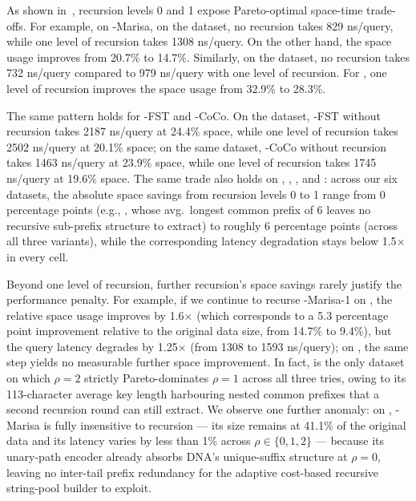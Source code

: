 As shown in~, recursion levels 0 and 1 expose Pareto-optimal space-time trade-offs.
  For example, on \csquared-Marisa, on the \logdata dataset, no recursion takes
  829 ns/query, while one level of recursion takes 1308 ns/query. On the other
  hand, the space usage improves from 20.7\% to 14.7\%. Similarly, on the
  \wikidata dataset, no recursion takes 732 ns/query compared to 979 ns/query
  with one level of recursion. For \wikidata, one level of recursion improves
  the space usage from 32.9\% to 28.3\%.

  The same pattern holds for \csquared-FST and \csquared-CoCo. On the \logdata
  dataset, \csquared-FST without recursion takes 2187 ns/query at 24.4\% space,
  while one level of recursion takes 2502 ns/query at 20.1\% space; on the same
  dataset, \csquared-CoCo without recursion takes 1463 ns/query at 23.9\% space,
  while one level of recursion takes 1745 ns/query at 19.6\% space. The same
  trade also holds on \wikidata, \xmldata, \urldata, and \dnadata: across our
  six datasets, the absolute space savings from recursion levels 0 to 1 range
  from 0 percentage points (e.g., \wordsdata, whose avg.\ longest common prefix
  of 6 leaves no recursive sub-prefix structure to extract) to roughly 6
  percentage points (\logdata across all three variants), while the
  corresponding latency degradation stays below 1.5$\times$ in every cell.

  Beyond one level of recursion, further recursion's space savings rarely justify the
  performance penalty. For example, if we continue to recurse \csquared-Marisa-1
  on \logdata, the relative space usage improves by 1.6$\times$ (which
  corresponds to a 5.3 percentage point improvement relative to the original
  data size, from 14.7\% to 9.4\%), but the query latency degrades by 1.25$\times$
  (from 1308 to 1593 ns/query); on \xmldata, the same step yields no measurable
  further space improvement. In fact, \logdata is the only dataset on which
  $\rho{=}2$ strictly Pareto-dominates $\rho{=}1$ across all three tries, owing
  to its 113-character average key length harbouring nested common prefixes
  that a second recursion round can still extract. We observe one further
  anomaly: on \dnadata, \csquared-Marisa is fully insensitive to recursion ---
  its size remains at 41.1\% of the original data and its latency varies by less
  than 1\% across $\rho \in \{0,1,2\}$ --- because its unary-path encoder
  already absorbs DNA's unique-suffix structure at $\rho{=}0$, leaving no
  inter-tail prefix redundancy for the adaptive cost-based recursive
  string-pool builder to exploit.


